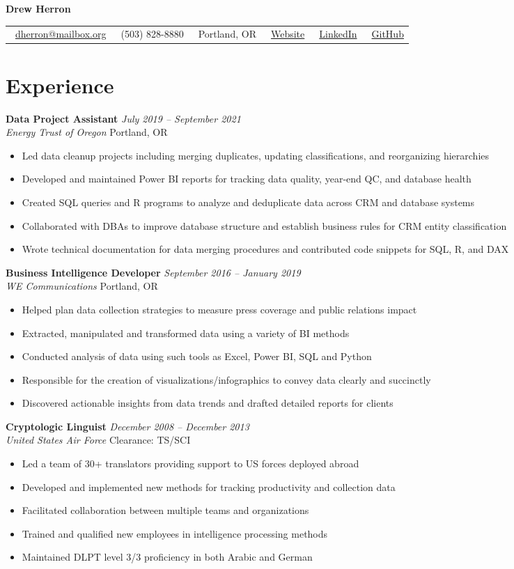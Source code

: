 \documentclass[letterpaper,11pt]{article}
\makeatletter
\newcommand{\contact}[6]{
  \begin{center}
    \begin{tabular*}{\textwidth}{@{\extracolsep{\fill}} l l l l l l}
      \faEnvelope\ \href{mailto:#1}{#1} & 
      \faPhone\ #2 & 
      \faMapMarker*\ #3 & 
      \faGlobe\ \href{#4}{Website} & 
      \faLinkedin\ \href{#5}{LinkedIn} &
      \faGithub\ \href{#6}{GitHub}
    \end{tabular*}
  \end{center}
}
\newcommand{\entry}[4]{
  \vspace{0.1em}
  \noindent\textbf{#1} \hfill \textit{#2}
  \\ \textit{#3} \hfill #4
  \vspace{0.3em}
}
\newcommand{\achievement}[1]{
  \vspace{-.5em}
  \item #1
}
\makeatother
\begin{document}
\begin{center}
  {\Huge\textbf{Drew Herron}}
\end{center}
  
  \contact
    {dherron@mailbox.org}
    {(503) 828-8880}
    {Portland, OR}
    {https://www.drewherron.com}
    {https://www.linkedin.com/in/drew-herron}
    {https://github.com/drewherron}

\section{Experience}

\entry{Data Project Assistant}{July 2019 -- September 2021}{Energy Trust of Oregon}{Portland, OR}
\begin{itemize}[leftmargin=*]
  \achievement{Led data cleanup projects including merging duplicates, updating classifications, and reorganizing hierarchies}
  \achievement{Developed and maintained Power BI reports for tracking data quality, year-end QC, and database health}
  \achievement{Created SQL queries and R programs to analyze and deduplicate data across CRM and database systems}
  \achievement{Collaborated with DBAs to improve database structure and establish business rules for CRM entity classification}
  \achievement{Wrote technical documentation for data merging procedures and contributed code snippets for SQL, R, and DAX}
\end{itemize}

\entry{Business Intelligence Developer}{September 2016 -- January 2019}{WE Communications}{Portland, OR}
\begin{itemize}[leftmargin=*]
  \achievement{Helped plan data collection strategies to measure press coverage and public relations impact}
  \achievement{Extracted, manipulated and transformed data using a variety of BI methods}
  \achievement{Conducted analysis of data using such tools as Excel, Power BI, SQL and Python}
  \achievement{Responsible for the creation of visualizations/infographics to convey data clearly and succinctly}
  \achievement{Discovered actionable insights from data trends and drafted detailed reports for clients}
\end{itemize}

\entry{Cryptologic Linguist}{December 2008 -- December 2013}{United States Air Force}{Clearance: TS\hspace{.1em}/\hspace{.03em}SCI}
\begin{itemize}[leftmargin=*]
  \achievement{Led a team of 30+ translators providing support to US forces deployed abroad}
  \achievement{Developed and implemented new methods for tracking productivity and collection data}
  \achievement{Facilitated collaboration between multiple teams and organizations}
  \achievement{Trained and qualified new employees in intelligence processing methods}
  \achievement{Maintained DLPT level 3/3 proficiency in both Arabic and German}
\end{itemize}
\end{document}
